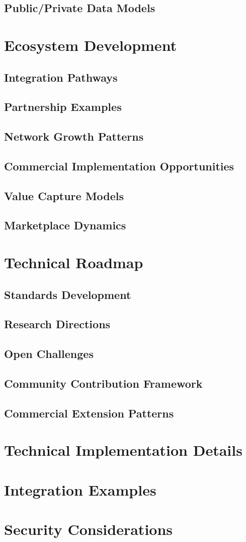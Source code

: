 \documentclass[11pt]{article}
\begin{document}
\subsection{Public/Private Data Models}

\section{Ecosystem Development}
\subsection{Integration Pathways}
\subsection{Partnership Examples}
\subsection{Network Growth Patterns}
\subsection{Commercial Implementation Opportunities}
\subsection{Value Capture Models}
\subsection{Marketplace Dynamics}

\section{Technical Roadmap}
\subsection{Standards Development}
\subsection{Research Directions}
\subsection{Open Challenges}
\subsection{Community Contribution Framework}
\subsection{Commercial Extension Patterns}




\appendix
\section{Technical Implementation Details}
\section{Integration Examples}
\section{Security Considerations}
\end{document}
